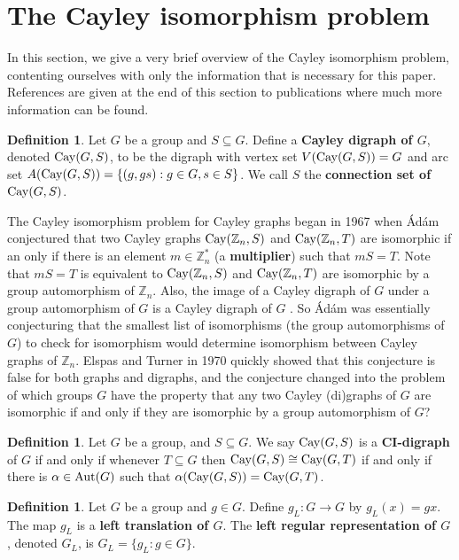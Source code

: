 \documentclass{amsart}
\theoremstyle{definition}
\newtheorem{definition}[thrm]{Definition}
\theoremstyle{remark}
\numberwithin{equation}{section}
\def\Z{{\mathbb Z}}
\def\Aut{{\rm Aut}}
\def\Cay{{\rm Cay}}
\begin{document}
\section{The Cayley isomorphism problem}

In this section, we give a very brief overview of the Cayley isomorphism problem, contenting ourselves with only the information that is necessary for this paper.  References are given at the end of this section to publications where much more information can be found.

\begin{definition}
Let $G$ be a group and $S\subseteq G$. Define a {\bf Cayley digraph of $G$},  denoted $\Cay(G,S)$, to be the digraph with vertex set $V(\Cay(G,S)) = G$ and arc set $A(\Cay(G,S)) = \{(g,gs):g\in G, s\in S\}$.  We call $S$ the {\bf connection set of $\Cay(G,S)$}.
\end{definition}

The Cayley isomorphism problem for Cayley graphs began in 1967 when \'Ad\'am conjectured \cite{Adam1967} that two Cayley graphs $\Cay(\Z_n,S)$ and $\Cay(\Z_n,T)$ are isomorphic if an only if there is an element $m\in\Z_n^*$ (a {\bf multiplier}) such that $mS = T$.  Note that $mS = T$ is equivalent to $\Cay(\Z_n,S)$ and $\Cay(\Z_n,T)$ are isomorphic by a group automorphism of $\Z_n$.  Also, the image of a Cayley digraph of $G$ under a group automorphism of $G$ is a Cayley digraph of $G$ \cite[Lemma 1.2.15]{Book}.  So \'Ad\'am was essentially conjecturing that the smallest list of isomorphisms (the group automorphisms of $G$) to check for isomorphism would determine isomorphism between Cayley graphs of $\Z_n$.  Elspas and Turner \cite{ElspasT1970} in 1970 quickly showed that this conjecture is false for both graphs and digraphs, and the conjecture changed into the problem of which groups $G$ have the property that any two Cayley (di)graphs of $G$ are isomorphic if and only if they are isomorphic by a group automorphism of $G$?

\begin{definition}
Let $G$ be a group, and $S\subseteq G$.  We say $\Cay(G,S)$ is a {\bf CI-digraph} of $G$ if and only if whenever $T\subseteq G$ then $\Cay(G,S)\cong\Cay(G,T)$ if and only if there is $\alpha\in \Aut(G)$ such that $\alpha(\Cay(G,S)) = \Cay(G,T)$.
\end{definition}

\begin{definition}\label{leftregularrepresentation}
Let $G$ be a group and $g\in G$.  Define $g_L\colon G\to G$ by $g_L(x) = gx$.  The map $g_L$ is a {\bf left translation of $G$}. The {\bf left regular representation of $G$}, denoted $G_L$, is $G_L = \{g_L:g\in G\}$.
\end{definition}
\end{document}
